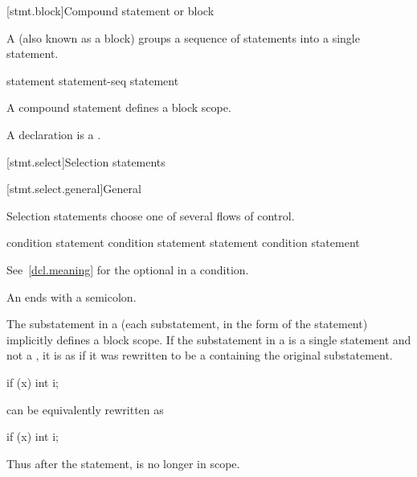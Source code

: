 [stmt.block]{Compound statement or block}%
%

\pnum
A  (also known as a block) groups a
sequence of statements into a single statement.

\begin{bnf}
\br
    \terminal{\{}  \terminal{\}}
\end{bnf}

\begin{bnf}
\br
    statement\br
    statement-seq statement
\end{bnf}

A compound statement defines a block scope.
\begin{note}
A declaration is a .
\end{note}

[stmt.select]{Selection statements}%

[stmt.select.general]{General}%

\pnum
Selection statements choose one of several flows of control.

%
%
%
\begin{bnf}
\br
      \terminal{(}  condition \terminal{)} statement\br
      \terminal{(}  condition \terminal{)} statement  statement\br
     \terminal{(}  condition \terminal{)} statement
\end{bnf}

See~\ref{dcl.meaning} for the optional  in a condition.
\begin{note}
An  ends with a semicolon.
\end{note}

\pnum
{}%
The substatement in a  (each substatement,
in the  form of the  statement) implicitly defines
a block scope. If the substatement in a
 is a single statement and not a
, it is as if it was rewritten to be a
 containing the original substatement.
\begin{example}
\begin{codeblock}
if (x)
  int i;
\end{codeblock}
can be equivalently rewritten as
\begin{codeblock}
if (x) {
  int i;
}
\end{codeblock}

Thus after the  statement,  is no longer in scope.
\end{example}

